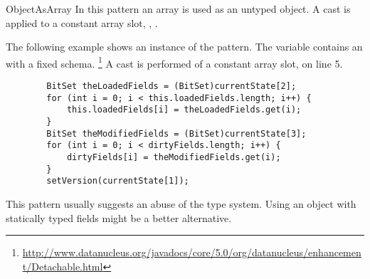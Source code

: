 \begin{pattern}{ObjectAsArray}
In this pattern an array is used as an untyped object.
A cast is applied to a constant array slot, \eg, .

\instances{}
The following example%
\def\urlvar{http://bit.ly/datanucleus_datanucleus_core_2S1L5Zf}
shows an instance of the \thisp{} pattern.
The variable  contains an  with a fixed
schema.%
\footnote{\url{http://www.datanucleus.org/javadocs/core/5.0/org/datanucleus/enhancement/Detachable.html}}
A cast is performed of a constant array slot,  on line 5.

\begin{verbatim}
        BitSet theLoadedFields = (BitSet)currentState[2];
        for (int i = 0; i < this.loadedFields.length; i++) {
            this.loadedFields[i] = theLoadedFields.get(i);
        }
        BitSet theModifiedFields = (BitSet)currentState[3];
        for (int i = 0; i < dirtyFields.length; i++) {
            dirtyFields[i] = theModifiedFields.get(i);
        }
        setVersion(currentState[1]);
\end{verbatim}

\discussion{}
This pattern usually suggests an abuse of the type system.
Using an object with statically typed fields might be a better alternative.

\end{pattern}
